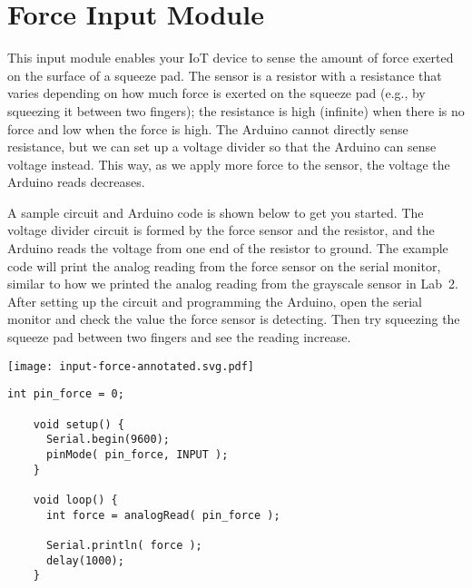 
\clearpage
\section{Force Input Module}
\label{sec-input-force}

This input module enables your IoT device to sense the amount of force
exerted on the surface of a squeeze pad. The sensor is a resistor with a
resistance that varies depending on how much force is exerted on the
squeeze pad (e.g., by squeezing it between two fingers); the resistance
is high (infinite) when there is no force and low when the force is
high. The Arduino cannot directly sense resistance, but we can set up a
voltage divider so that the Arduino can sense voltage instead. This way,
as we apply more force to the sensor, the voltage the Arduino reads
decreases.


A sample circuit and Arduino code is shown below to get you started.
The voltage divider circuit is formed by the force sensor and the
 resistor, and the Arduino reads the voltage from one end
of the resistor to ground. The example code will print the analog
reading from the force sensor on the serial monitor, similar to how we
printed the analog reading from the grayscale sensor in Lab~2. After
setting up the circuit and programming the Arduino, open the serial
monitor and check the value the force sensor is detecting. Then try
squeezing the squeeze pad between two fingers and see the reading
increase.

\vspace{0.1in}
\begin{minipage}[t]{0.49\tw}
  \vspace{0pt}

  \texttt{[image: input-force-annotated.svg.pdf]}
\end{minipage}
\hfill
\begin{minipage}[t]{0.49\tw}
  \vspace{0.1in}
  \begin{Verbatim}[gobble=3,fontsize=\small]
    int pin_force = 0;

    void setup() {
      Serial.begin(9600);
      pinMode( pin_force, INPUT );
    }

    void loop() {
      int force = analogRead( pin_force );

      Serial.println( force );
      delay(1000);
    }
  \end{Verbatim}
\end{minipage}
\vspace{0.1in}

